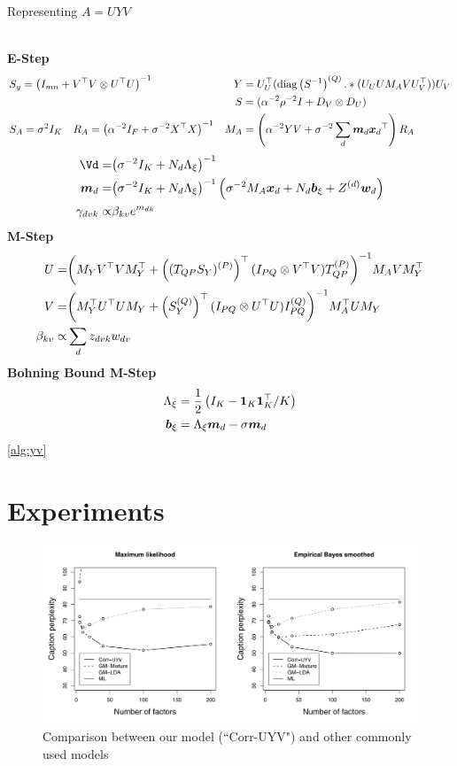 \begin{algorithm}
\caption{Representing $A=UYV$}
\label{alg:uyv}
$\text{ }$\\
{\bf E-Step}
    \begin{align*}
        & S_y = {\left( I_{mn} + V^\top V \otimes U^\top U \right)}^{-1} \quad &
Y & = U_U^\top (\text{diag} \left( {{S}^{-1}} \right)^{(Q)} .* (U_U U M_A V U_V^\top)) U_V \\
        & &
        S & = (\alpha^{-2}\rho^{-2} I + D_V \otimes D_U) \\
        & S_A = \sigma^2 I_K \quad R_A = {\left( \alpha^{-2} I_F + \sigma^{-2} X^\top X \right)}^{-1} 
        & M_A & = \left(\alpha^{-2} YV + \sigma^{-2} \sum_d \bm m_d { \bm x_d }^\top\right)R_A
    \end{align*}
    \begin{align*}
         \Vd = & \invb{\sigma^{-2}I_K + N_d \Axi}\\
         \md = & \invb{\sigma^{-2}I_K + N_d \Axi} \left(\sigma^{-2} M_A \xd  + N_d \bxi + Z^{(d)}\vv{w}_d \right )\\
        \gamma_{dvk} \propto & \beta_{kv} e^{m_{dk}} 
\end{align*}
{\bf M-Step}
\begin{align*}
    U = & {\left( M_Y V^\top V M_Y^\top + \left( { (T_{QP} S_Y)^{(P)} } \right)^\top (I_{PQ} \otimes V^\top V){ T_{QP}^{(P)} } \right)}^{-1} M_A V M_Y^\top \\
    V = & {\left( M_Y^\top U^\top U M_Y + \left({ S_Y^{(Q)} }\right)^\top (I_{PQ} \otimes U^\top U) { I_{PQ}^{(Q)} }  \right)}^{-1} M_A ^\top U M_Y \\
    \beta_{kv} \propto & \sum_d z_{dvk} w_{dv} 
\end{align*}
{\bf Bohning Bound M-Step}
    \begin{align*}
        { \Lambda_{\xi} } & = \frac{1}{2} \left(I_K - \mathbf{1}_K\mathbf{1}_K^\top / K  \right) \\
        { \bm b_{\xi} } & = { \Lambda_{\xi} } \bm m_d  - \sigma{ \bm m _d}
    \end{align*}
\ref{alg:yv}
\end{algorithm}



\section{Experiments}
\begin{figure}
  \centering
    \hspace*{-1.5cm}\includegraphics[height=0.25\textheight]{plots/figs/Fig5.png}
  \caption{Comparison between our model (``Corr-UYV") and other commonly used models}
  \label{fig:uyv-fig}
\end{figure}

